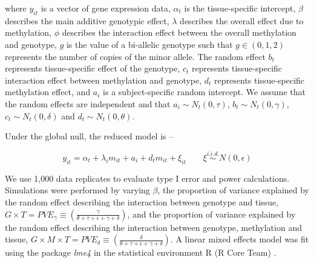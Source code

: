 \documentclass[hidelinks]{article}
\begin{document}
where $y_{it}$ is a vector of gene expression data, $\alpha_t$ is the tissue-specific intercept, $\beta$ describes the main additive genotypic effect, $\lambda$ describes the overall effect due to methylation, $\phi$ describes the interaction effect between the overall methylation and genotype,  $g$ is the value of a bi-allelic genotype such that $g \in \left(0,1,2\right)$ represents the number of copies of the minor allele. The random effect $b_t$ represents tissue-specific effect of the genotype, $c_t$ represents tissue-specific interaction effect between methylation and genotype, $d_t$ represents tissue-specific methylation effect, and $a_i$ is a subject-specific random intercept. We assume that the random effects are independent and that $a_i \sim N_t \left(0, \tau \right)$, $b_t \sim N_t \left(0, \gamma \right)$, $c_t \sim N_t \left(0,\delta\right)$ and $d_t \sim N_t \left(0,\theta\right)$. 

Under the global null, the reduced model is --

\begingroup
\large
\begin{equation}
y_{it} = \alpha_t + \lambda_i m_{it} + a_i + d_t m_{it} + \xi_{it} \qquad \xi  \overset{i.i.d.} \sim N \left( 0, \epsilon \right)
\end{equation}
\endgroup

We use 1,000 data replicates to evaluate type I error and power calculations. Simulations were performed by varying $\beta$, the proportion of variance explained by the random effect describing the interaction between genotype and tissue, $G \times T = PVE_{\gamma} \equiv \left(\frac{ \gamma}{\theta + \tau + \epsilon + \gamma + \delta }\right)$, and the proportion of variance explained by the random effect describing the interaction between genotype, methylation and tissue, $G \times M \times T = PVE_{\delta} \equiv \left(\frac{ \delta}{\theta + \tau + \epsilon + \gamma + \delta}\right)$. A linear mixed effects model was fit using the package \emph{lme4} \cite{lme4} in the statistical environment R (R Core Team) \cite{R}.
\end{document}
